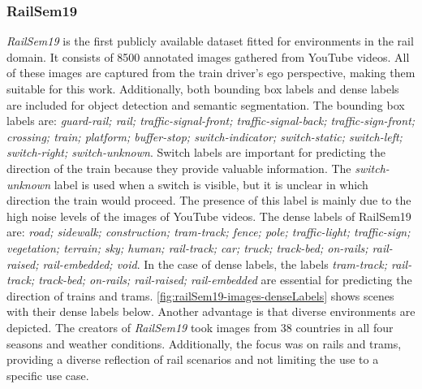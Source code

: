 
\subsubsection{RailSem19}
\textit{RailSem19} \cite{railsem19dataset} is the first publicly available dataset fitted for environments in the rail domain. It consists of 8500 annotated images gathered from YouTube videos. All of these images are captured from the train driver's ego perspective, making them suitable for this work. Additionally, both bounding box labels and dense labels are included for object detection and semantic segmentation. The bounding box labels are: \textit{guard-rail; rail; traffic-signal-front; traffic-signal-back; traffic-sign-front; crossing; train; platform; buffer-stop; switch-indicator; switch-static; switch-left; switch-right; switch-unknown}. Switch labels are important for predicting the direction of the train because they provide valuable information. The \textit{switch-unknown} label is used when a switch is visible, but it is unclear in which direction the train would proceed. The presence of this label is mainly due to the high noise levels of the images of YouTube videos.
The dense labels of RailSem19 are: \textit{road; sidewalk; construction; tram-track; fence; pole; traffic-light; traffic-sign; vegetation; terrain; sky; human; rail-track; car; truck; track-bed; on-rails; rail-raised; rail-embedded; void}. In the case of dense labels, the labels \textit{tram-track; rail-track; track-bed; on-rails; rail-raised; rail-embedded} are essential for predicting the direction of trains and trams. \autoref{fig:railSem19-images-denseLabels} shows scenes with their dense labels below.
Another advantage is that diverse environments are depicted. The creators of \textit{RailSem19} took images from 38 countries in all four seasons and weather conditions. Additionally, the focus was on rails and trams, providing a diverse reflection of rail scenarios and not limiting the use to a specific use case.

